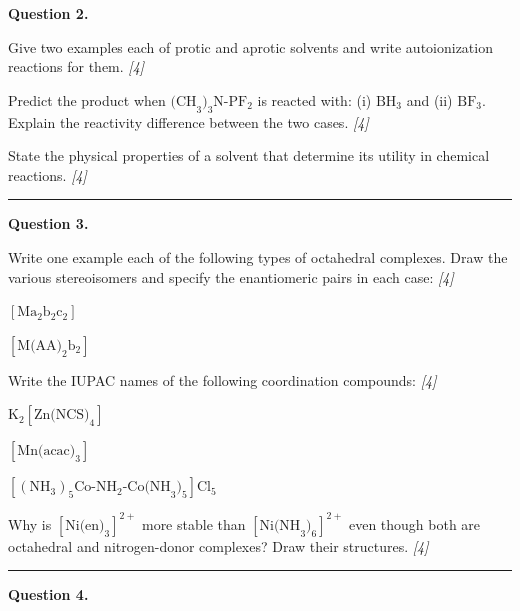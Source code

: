 \documentclass[11pt,a4paper]{article}
\newcommand{\pts}[1]{\hfill   \textit{[#1]}}
\begin{document}
\noindent   \textbf{Question 2.}

\begin{parts}
  \item Give two examples each of protic and aprotic solvents and write autoionization reactions for them. \pts{4}
  \item Predict the product when $ \text{(CH}_3)_3 \text{N-PF}_2$ is reacted with: (i) $ \text{BH}_3$ and (ii) $ \text{BF}_3$. Explain the reactivity difference between the two cases. \pts{4}
  \item State the physical properties of a solvent that determine its utility in chemical reactions. \pts{4}
\end{parts}

\medskip\rule{\linewidth}{0.2pt}




\noindent   \textbf{Question 3.}

\begin{parts}
  \item Write one example each of the following types of octahedral complexes. Draw the various stereoisomers and specify the enantiomeric pairs in each case: \pts{4}
  
\begin{parts}
    \item $[ \text{Ma}_2 \text{b}_2 \text{c}_2]$
    \item $[ \text{M(AA)}_2 \text{b}_2]$
  \end{parts}
  \item Write the IUPAC names of the following coordination compounds: \pts{4}
  
\begin{parts}
    \item $ \text{K}_2[ \text{Zn(NCS)}_4]$
    \item $[ \text{Mn(acac)}_3]$
    \item $[( \text{NH}_3)_5 \text{Co-NH}_2 \text{-Co(NH}_3)_5] \text{Cl}_5$
  \end{parts}
  \item Why is $[ \text{Ni(en)}_3]^{2+}$ more stable than $[ \text{Ni(NH}_3)_6]^{2+}$ even though both are octahedral and nitrogen-donor complexes? Draw their structures. \pts{4}
\end{parts}

\medskip\rule{\linewidth}{0.2pt}




\noindent   \textbf{Question 4.}
\end{document}
